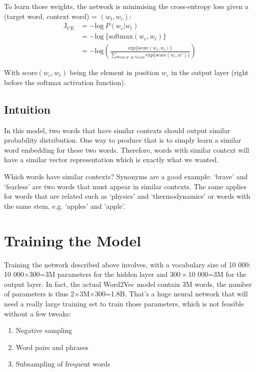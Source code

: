 To learn those weights, the network is minimising the cross-entropy loss given a (target word, context word) = $(w_t, w_c)$:
\begin{align}
    \text{J}_{\text{CE}}   &=  -\text{log}~P(w_c | w_t) \nonumber\\
    &= -\text{log}~\{\text{softmax}(w_c, w_t)\}\nonumber\\
    &= -\text{log}\left(\frac{\text{exp}\{\text{score}(w_c, w_t)\}}{\sum_{\text{Word w' in Vocab}}\text{exp}\{\text{score}(w_c, w')\}} \right)
    \label{cross-entropy}
\end{align}

With $\text{score}(w_c, w_t)$ being the element in position $w_c$ in the output layer (right before the softmax activation function).

\subsection{Intuition}
In this model, two words that have similar contexts should output similar probability distribution. One way to produce that is to simply learn a similar word embedding for these two words. Therefore, words with similar context will have a similar vector representation which is exactly what we wanted.

Which words have similar contexts? Synonyms are a good example: `brave' and `fearless' are two words that must appear in similar contexts. The same applies for words that are related such as `physics' and `thermodynamics' or words with the same stem, e.g. `apples' and 'apple'. 

\newpage
\section{Training the Model}
Training the network described above involves, with a vocabulary size of 10 000: 10 000$\times300$=3M parameters for the hidden layer and $300\times$10 000=3M for the output layer. In fact, the actual Word2Vec model contain 3M words, the number of parameters is thus 2$\times$3M$\times$300=1.8B. That's a huge neural network that will need a really large training set to train those parameters, which is not feasible without a few tweaks:

\begin{enumerate}
    \item Negative sampling
    \item Word pairs and phrases
    \item Subsampling of frequent words
\end{enumerate}

